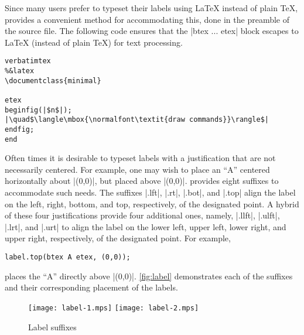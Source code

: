 Since many \MP{} users prefer to typeset their labels using \LaTeX{}
instead of plain \TeX, \MP{} provides a convenient method for
accommodating this, done in the preamble of the \MP{} source file.  The
following code ensures that the |btex ... etex| block escapes to
\LaTeX{} (instead of plain \TeX) for text processing.

\begin{lstlisting}[style=MP, commentstyle={}]
verbatimtex
%&latex
\documentclass{minimal}

etex
beginfig(|$n$|);
|\quad$\langle\mbox{\normalfont\textit{draw commands}}\rangle$|
endfig;
end
\end{lstlisting}

Often times it is desirable to typeset labels with a justification that
are not necessarily centered.  For example, one may wish to place an
``A'' centered horizontally about |(0,0)|, but placed above
|(0,0)|. \MP{} provides eight suffixes to accommodate such needs.  The
suffixes |.lft|, |.rt|, |.bot|, and |.top| align the label on the left,
right, bottom, and top, respectively, of the designated point.  A hybrid
of these four justifications provide four additional ones, namely,
|.llft|, |.ulft|, |.lrt|, and |.urt| to align the label on the lower
left, upper left, lower right, and upper right, respectively, of the
designated point.  For example,

\begin{lstlisting}[style=MP]
label.top(btex A etex, (0,0));
\end{lstlisting}
places the ``A'' directly above |(0,0)|.  \autoref{fig:label}
demonstrates each of the suffixes and their corresponding placement of
the labels.

\begin{figure}
  \hfill%
  \texttt{[image: label-1.mps]}
  \hfill%
  \texttt{[image: label-2.mps]}
  \hfill\mbox{}
  \caption{Label suffixes}
  \label{fig:label}
\end{figure}
